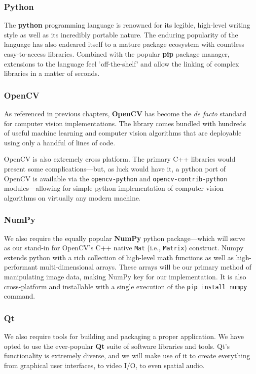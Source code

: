 \documentclass{report}
\newcommand{\tech}[1]{\textbf{#1}}
\begin{document}
\subsubsection{Python}

The \tech{python} programming language is renowned for its legible, high-level writing style as well as its incredibly portable nature. The enduring popularity of the language has also endeared itself to a mature package ecosystem with countless easy-to-access libraries. Combined with the popular \tech{pip} package manager, extensions to the language feel 'off-the-shelf' and allow the linking of complex libraries in a matter of seconds.

\subsubsection{OpenCV}
As referenced in previous chapters, \tech{OpenCV} has become the \emph{de facto} standard for computer vision implementations. The library comes bundled with hundreds of useful machine learning and computer vision algorithms that are deployable using only a handful of lines of code.

OpenCV is also extremely cross platform. The primary C++ libraries would present some complications---but, as luck would have it, a python port of OpenCV is available via the \texttt{opencv-python} and \texttt{opencv-contrib-python} modules---allowing for simple python implementation of computer vision algorithms on virtually any modern machine. 

\subsubsection{NumPy}
We also require the equally popular \tech{NumPy} python package---which will serve as our stand-in for OpenCV's C++ native \texttt{Mat} (i.e., \texttt{Matrix}) construct. Numpy extends python with a rich collection of high-level math functions as well as high-performant multi-dimensional arrays. These arrays will be our primary method of manipulating image data, making NumPy key for our implementation. It is also cross-platform and installable with a single execution of the \texttt{pip install numpy} command.

\subsubsection{Qt}
We also require tools for building and packaging a proper application. We have opted to use the ever-popular \tech{Qt} suite of software libraries and tools. Qt's functionality is extremely diverse, and we will make use of it to create everything from graphical user interfaces, to video I/O, to even spatial audio.
\end{document}
